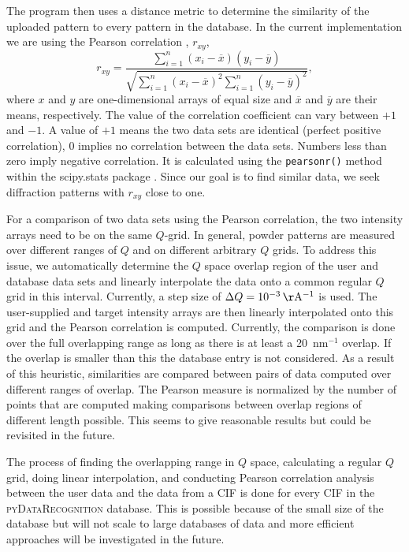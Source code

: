 \documentclass[preprint]{iucr}
\newcommand{\pydr}{\textsc{pyDataRecognition}\xspace}
\begin{document}
The program then uses a distance metric to determine the similarity of the uploaded pattern to every pattern in the database.   In the current implementation we are using the Pearson correlation \cite{ pearsonVIINoteRegression1895}, $r_{xy}$,
\begin{equation}
    r_{xy} = \dfrac{\sum\limits_{i=1}^{n}(x_{i}-\overline{x})(y_{i}-\overline{y})}{\sqrt{\sum\limits_{i=1}^{n} (x_{i}-\overline{x})^{2}\sum\limits_{i=1}^{n}(y_{i}-\overline{y})^{2}}},
\end{equation}
where $x$ and $y$ are one-dimensional arrays of equal size and $\overline{x}$ and $\overline{y}$ are their means, respectively. The value of the correlation coefficient can vary between $+1$ and $-1$. A  value of $+1$ means the two data sets are identical (perfect positive correlation), 0 implies no correlation between the data sets. Numbers less than zero imply negative correlation. It is calculated using the \texttt{pearsonr()} method within the scipy.stats package \cite{virtanenSciPyFundamentalAlgorithms2020b}. Since our goal is to find similar data, we seek diffraction patterns with $r_{xy}$ close to one.

For a comparison of two data sets using the Pearson correlation, the two intensity arrays need to be on the same $Q$-grid. In general, powder patterns are measured over different ranges of $Q$ and on different arbitrary $Q$ grids.  To address this issue, we automatically determine the $Q$ space overlap region of the user and database data sets
and linearly interpolate the data onto a common regular $Q$ grid in this interval. 
Currently, a step size of $\Delta Q=10^{-3}\,\mathrm{\AA^{-1}}$ is used.  The user-supplied and target intensity arrays are then linearly interpolated onto this grid and the Pearson correlation is computed.  
Currently, the comparison is done over the full overlapping range as long as there is at least a 20~nm$^{-1}$ overlap.  If the overlap is smaller than this the database entry is not considered.  As a result of this heuristic, similarities are compared between pairs of data computed over different ranges of overlap. The Pearson measure is normalized by the number of points that are computed making comparisons between overlap regions of different length possible. This seems to give reasonable results but could be revisited in the future. 

The process of finding the overlapping range in $Q$ space, calculating a regular $Q$ grid, doing linear interpolation, and conducting Pearson correlation analysis between the user data and the data from a CIF is done for every CIF in the \pydr database. 
This is possible because of the small size of the database but will not scale to large databases of data and more efficient approaches will be investigated in the future.
\end{document}
